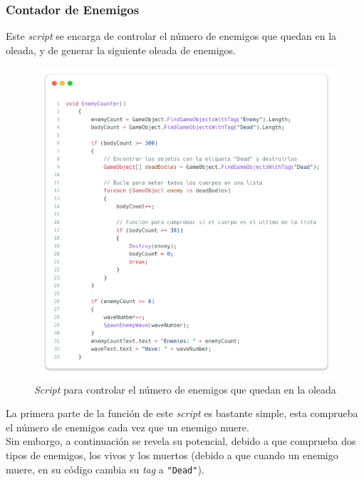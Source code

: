 \documentclass[11pt]{article}
\begin{document}
            \newpage
            \subsubsection{Contador de Enemigos}
                Este \textit{script} se encarga de controlar el número de enemigos que quedan en la oleada, y de generar la siguiente oleada de enemigos.\\
                \begin{figure}[H]
                    \centering
                    \includegraphics[width=\textwidth]{Images/Misc/EnemyCounter.png}
                    \caption{\textit{Script} para controlar el número de enemigos que quedan en la oleada}
                \end{figure}

                \newpage
                La primera parte de la función de este \textit{script} es bastante simple, esta comprueba el número de enemigos cada vez que un enemigo muere.\\ 
                
                Sin embargo, a continuación se revela su potencial, debido a que comprueba dos tipos de enemigos, los vivos y los muertos (debido a que cuando un enemigo muere, en su código cambia su \textit{tag} a \texttt{"Dead"}).\\
\end{document}
